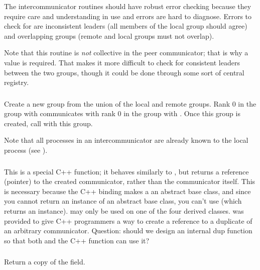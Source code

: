 \documentclass{article}
\begin{document}
The intercommunicator routines should have robust error checking because they
require care and understanding in use and errors are hard to diagnose.  
Errors to check for are inconsistent leaders (all members of the local
group should agree) and overlapping groups (remote and local groups
must not overlap).

Note that this routine is \emph{not} collective in the peer
communicator; that is why a  value is required.  That makes
it more difficult to check for consistent leaders between the two
groups, though it could be done tbrough some sort of central registry.
 
\subsubsection{}
Create a new group from the union of the local and remote groups.  Rank 0 in
the group with  communicates with rank 0 in the group with
.  Once this group is created, call
 with this group.  

Note that all processes in an intercommunicator are already known to the
local process (see ).

\subsubsection{}
This is a special C++ function; it behaves similarly to
, but returns a reference (pointer) to the created
communicator, rather than the communicator itself.  This is necessary because
the C++ binding makes a  an abstract base class, and since
you cannot return an instance of an abstract base class, you can't use
 (which returns an instance).  
may only be used on one of the four derived classes.
 was provided to give C++ programmers a way to
create a reference to a duplicate of an arbitrary communicator.
Question: should we design an internal dup function so that both
 and the C++  function can use it?

\subsubsection{}
Return a copy of the  field.
\end{document}
